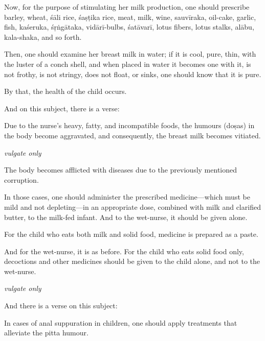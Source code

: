 \begin{translation}
\begin{tt}
\item[31]

Now, for the purpose of stimulating her milk production, one should
prescribe barley, wheat, \gls{śāli} rice, \gls{śaṣṭika} rice, meat, milk, wine,
\gls{sauvīraka}, oil-cake, garlic, fish, \gls{kaśeruka}, \gls{śṛṅgātaka}, \gls{vidārī}-bulbs,
\gls{śatāvarī}, lotus fibers, lotus stalks, \gls{alābu}, \gls{kala-shaka}, and so forth.

Then, one should examine her breast milk in water; if it is cool, pure,
thin, with the luster of a conch shell, and when placed in water it
becomes one with it, is not frothy, is not stringy, does not float, or
sinks, one should know that it is pure.

By that, the health of the child occurs.

\item[32]

And on this subject, there is a verse:~

Due to the nurse's heavy, fatty, and incompatible foods,
the humours (doṣas) in the body become aggravated, and consequently, the
breast milk becomes vitiated.

\item[33--36] \emph{vulgate only}

\item[37]

The body becomes afflicted with diseases due to the previously mentioned
corruption.

In those cases, one should administer the prescribed medicine---which
must be mild and not depleting---in an appropriate dose, combined with
milk and clarified butter, to the milk-fed infant. And to the
wet-nurse, it should be given alone.

For the child who eats both milk and solid food, medicine is prepared as
a paste.

And for the wet-nurse, it is as before. For the child who eats solid
food only, decoctions and other medicines should be given to the child
alone, and not to the wet-nurse.

\item[38--43] \emph{vulgate only}

\item[44]

And there is a verse on this subject:

\begin{sloka}
    In cases of anal suppuration in children, one should apply treatments
that alleviate the pitta humour.


\end{sloka}
\end{tt}
\end{translation}
